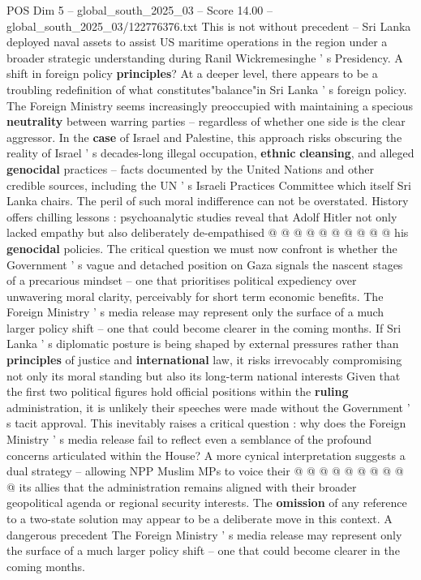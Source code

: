 \begin{textsample}{POS Dim 5 – global\_south\_2025\_03 – Score 14.00 – global\_south\_2025\_03/122776376.txt}
This is not without precedent -- Sri Lanka deployed naval assets to assist US maritime operations in the region under a broader strategic understanding during Ranil Wickremesinghe ' s Presidency.
A shift in foreign policy \textbf{principles}?
At a deeper level, there appears to be a troubling redefinition of what constitutes"balance"in Sri Lanka ' s foreign policy.
The Foreign Ministry seems increasingly preoccupied with maintaining a specious \textbf{neutrality} between warring parties -- regardless of whether one side is the clear aggressor.
In the \textbf{case} of Israel and Palestine, this approach risks obscuring the reality of Israel ' s decades-long illegal occupation, \textbf{ethnic} \textbf{cleansing}, and alleged \textbf{genocidal} practices -- facts documented by the United Nations and other credible sources, including the UN ' s Israeli Practices Committee which itself Sri Lanka chairs.
The peril of such moral indifference can not be overstated.
History offers chilling lessons : psychoanalytic studies reveal that Adolf Hitler not only lacked empathy but also deliberately de-empathised @ @ @ @ @ @ @ @ @ @ his \textbf{genocidal} policies.
The critical question we must now confront is whether the Government ' s vague and detached position on Gaza signals the nascent stages of a precarious mindset -- one that prioritises political expediency over unwavering moral clarity, perceivably for short term economic benefits.
The Foreign Ministry ' s media release may represent only the surface of a much larger policy shift -- one that could become clearer in the coming months.
If Sri Lanka ' s diplomatic posture is being shaped by external pressures rather than \textbf{principles} of justice and \textbf{international} law, it risks irrevocably compromising not only its moral standing but also its long-term national interests Given that the first two political figures hold official positions within the \textbf{ruling} administration, it is unlikely their speeches were made without the Government ' s tacit approval.
This inevitably raises a critical question : why does the Foreign Ministry ' s media release fail to reflect even a semblance of the profound concerns articulated within the House?
A more cynical interpretation suggests a dual strategy -- allowing NPP Muslim MPs to voice their @ @ @ @ @ @ @ @ @ @ its allies that the administration remains aligned with their broader geopolitical agenda or regional security interests.
The \textbf{omission} of any reference to a two-state solution may appear to be a deliberate move in this context.
A dangerous precedent The Foreign Ministry ' s media release may represent only the surface of a much larger policy shift -- one that could become clearer in the coming months.

\end{textsample}
